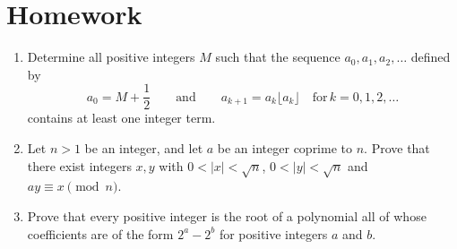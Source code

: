 \documentclass{article}
\begin{document}
\section{Homework}
  \begin{enumerate}
    \item Determine all positive integers $M$ such that the sequence $a_0, a_1,
      a_2, \ldots$ defined by \[ a_0 = M + \frac{1}{2} \qquad \textrm{and}
        \qquad a_{k+1} = a_k\lfloor a_k \rfloor \quad \textrm{for} \, k = 0, 1,
      2, \ldots \]contains at least one integer term.
    \item Let $n>1$ be an integer, and let $a$ be an integer coprime to $n$. Prove
      that there exist integers $x,y$ with $0<|x|<\sqrt n$, $0<|y|<\sqrt n$ and
      $ay\equiv x\pmod n$.
    \item Prove that every positive integer is the root of a polynomial all of whose
      coefficients are of the form $2^a-2^b$ for positive integers $a$ and $b$.
  \end{enumerate}
\end{document}
